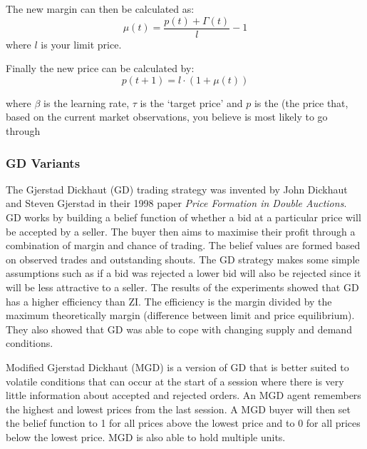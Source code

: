 \documentclass{acm_proc_article-sp}
\begin{document}
The new margin can then be calculated as:
\begin{equation}
\mu(t) = \frac{p(t) + \Gamma(t)}{l} - 1
\end{equation}
where $l$ is your limit price.

Finally the new price can be calculated by:
\begin{equation}
p(t+1) = l \cdot (1 + \mu(t))
\end{equation}


where $\beta$ is the learning rate, $\tau$ is the `target price' and $p$ is the (the price that, based on the current market observations, you believe is most likely to go through 
\\


\subsubsection{GD Variants} \label{sec:traders_GDV}

The Gjerstad Dickhaut (GD) trading strategy was invented by John Dickhaut and
Steven Gjerstad in their 1998 paper \emph{Price Formation in Double
Auctions}\cite{gd}.
GD works by building a belief function of whether a bid at a particular price
will be accepted by a seller.
The buyer then aims to maximise their profit through a combination of margin
and chance of trading.
The belief values are formed based on observed trades and outstanding shouts.
The GD strategy makes some simple assumptions such as if a bid was rejected a
lower bid will also be rejected since it will be less attractive to a seller.
The results of the experiments showed that GD has a higher efficiency than ZI.
The efficiency is the margin divided by the maximum theoretically margin
(difference between limit and price equilibrium).
They also showed that GD was able to cope with changing supply and demand
conditions.

Modified Gjerstad Dickhaut (MGD) \cite{mgd} is a version of GD that
is better suited to volatile conditions that can occur at the start of a
session where there is very little information about accepted and rejected
orders.
An MGD agent remembers the highest and lowest prices from the last session.
A MGD buyer will then set the belief function to 1 for all prices above the
lowest price and to 0 for all prices below the lowest price.
MGD is also able to hold multiple units.
\end{document}
